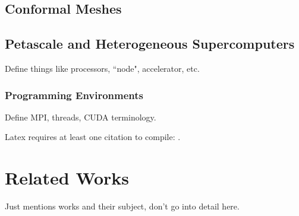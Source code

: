 \subsection{Conformal Meshes}

\subsection{Petascale and Heterogeneous Supercomputers}

Define things like processors, ``node", accelerator, etc.

\subsubsection{Programming Environments}

Define MPI, threads, CUDA terminology.

Latex requires at least one citation to
compile: \cite{edwards2013kokkos}.

\section{Related Works}

Just mentions works and their subject, don't go into detail here.

